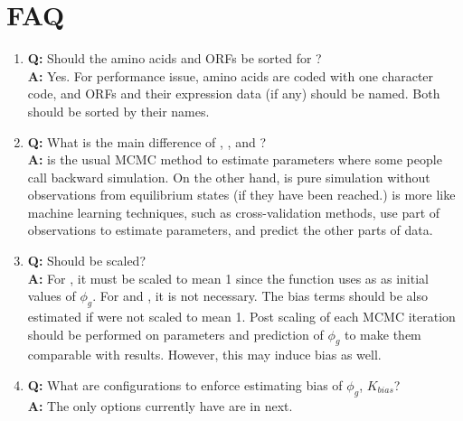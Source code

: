 
\section[FAQ]{FAQ}
\label{sec:faq}

\begin{enumerate}

\item {\bf\color{blue} Q:}
      Should the amino acids and ORFs be sorted for ? \\
      {\bf\color{blue} A:}
      Yes. For performance issue, amino acids are coded with one character
      code, and ORFs and their expression data (if any) should be named.
      Both should be sorted by their names.

\item {\bf\color{blue} Q:}
      What is the main difference of , , and
      ? \\
      {\bf\color{blue} A:}
       is the usual MCMC method to estimate parameters where
      some people call backward simulation.
      On the other hand,  is pure simulation without
      observations from equilibrium states (if they have been reached.)
       is more like machine learning techniques, such as
      cross-validation methods, use part of observations to estimate
      parameters, and predict the other parts of data.

\item {\bf\color{blue} Q:}
      Should  be scaled? \\
      {\bf\color{blue} A:}
      For , it must be scaled to mean 1 since the function uses
      as  as initial values of $\phi_g$.
      For  and , it is not necessary. The
      bias terms should be also estimated if  were not
      scaled to mean 1. Post scaling of each MCMC iteration should be
      performed on parameters and prediction of $\phi_g$ to make them
      comparable with  results. However, this may induce
      bias as well.

\item {\bf\color{blue} Q:}
      What are configurations to enforce estimating bias of $\phi_g$,
      $K_{bias}$? \\
      {\bf\color{blue} A:}
      The only options currently  have are in next.


\end{enumerate}
